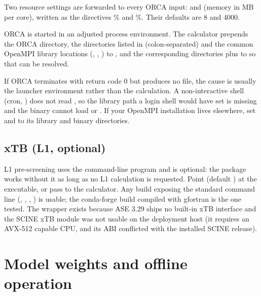 Two resource settings are forwarded to every ORCA input:  and
 (memory in MB per core), written as the directives
\% and \%.  Their defaults are 8 and 4000.

ORCA is started in an adjusted process environment.  The calculator prepends
the ORCA directory, the directories listed in 
(colon-separated) and the common OpenMPI library locations
(, ,
) to ,
and the corresponding  directories plus
 to  so that  can be
resolved.

\begin{notebox}
If ORCA terminates with return code 0 but produces no  file,
the cause is usually the launcher environment rather than the calculation.
A non-interactive shell (cron, ) does not read
, so the library path a login shell would have set is missing
and the binary cannot load  or .  If your OpenMPI
installation lives elsewhere, set  and
 to its library and binary directories.
\end{notebox}

\subsection{xTB (L1, optional)}

L1 pre-screening uses the  command-line program and is optional:
the package works without it as long as no L1 calculation is requested.
Point  (default ) at the executable, or pass
 to the calculator.  Any build exposing the standard command
line (, , , ) is usable;
the conda-forge build compiled with gfortran is the one tested.  The wrapper
exists because ASE 3.29 ships no built-in xTB interface and the SCINE xTB
module was not usable on the deployment host (it requires an AVX-512 capable
CPU, and its ABI conflicted with the installed SCINE release).

\section{Model weights and offline operation}

